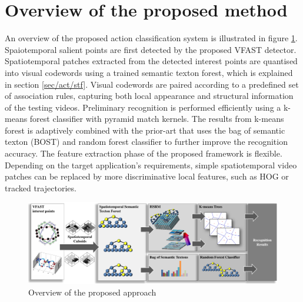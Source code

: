 \section{Overview of the proposed method} 
\label{sec/act/overview}

An overview of the proposed action classification system is illustrated in figure \ref{fig/act/flow}. 
Spaiotemporal salient points are first detected by the proposed VFAST detector. 
Spatiotemporal patches extracted from the detected interest points are quantised into visual codewords using a trained semantic texton forest, which is explained in section \ref{sec/act/stf}. 
Visual codewords are paired according to a predefined set of association rules, capturing both local appearance and structural information of the testing videos.  
Preliminary recognition is performed efficiently using a k-means forest classifier with pyramid match kernels. 
The results from k-means forest is adaptively combined with the prior-art that uses the bag of semantic texton (BOST) and random forest classifier to further improve the recognition accuracy.
The feature extraction phase of the proposed framework is flexible. 
Depending on the target application's requirements, simple spatiotemporal video patches can be replaced by more discriminative local features, such as HOG or tracked trajectories.

\begin{figure}[ht]
	\centering  	
	\includegraphics[width=1.0\linewidth]{fig/act/fig1_new4.pdf}
	\caption{Overview of the proposed approach}
	\label{fig/act/flow}
\end{figure}


